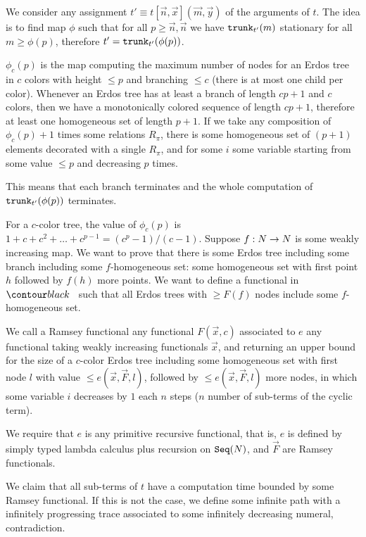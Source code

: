 We consider any assignment $t' \equiv t[\vec{n},\vec{x}](\vec{m},\vec{y})$ of the arguments of $t$.
The idea is to find map $\phi$ such that for all $p \ge \vec{n}, \vec{n}$ we have
${\tt trunk}_{t'}(m)$ stationary for all $m \ge \phi(p)$, therefore $t' = {\tt trunk}_{t'}(\phi(p))$.

$\phi_c(p)$ is the map computing the maximum number of nodes for an Erdos tree in $c$
colors with height $\le p$ and branching $\le c$ (there is at most one child per color).
Whenever an Erdos tree has at least a branch of length $cp+1$ and $c$ colors, 
then we have a monotonically colored sequence
of length $cp+1$, therefore at least one homogeneous set of length $p+1$. If we take any composition of 
$\phi_c(p)+1$ times some relations $R_\pi$, there is some homogeneous set of $(p+1)$ elements
decorated with a single $R_\pi$, and for some $i$ some variable starting from some value $\le p$ 
and decreasing $p$ times. 

This means that each branch terminates and the whole computation of ${\tt trunk}_{t'}(\phi(p))$ terminates.

For a $c$-color tree, the value of $\phi_c(p)$ is $1+c+c^2+\ldots+c^{p-1} = (c^{p}-1)/(c-1)$.
Suppose $f:{N} \rightarrow {N}$ is some weakly increasing map. We want to prove that
there is some Erdos tree including some branch including some $f$-homogeneous set: some
homogeneous set with first point $h$ followed by $f(h)$ more points. We
want to define a functional in $\systemT$ such that all Erdos trees with $\ge F(f)$ nodes
include some $f$-homogeneous set.

We call a Ramsey functional any functional $F(\vec{x},c)$ associated to $e$
any functional taking weakly increasing functionals $\vec{x}$,
and returning an upper bound for the size of a $c$-color Erdos tree including some homogeneous set
with first node $l$ with value $\le e(\vec{x},\vec{F},l)$, 
followed by $\le e(\vec{x},\vec{F},l)$ more nodes, in which some variable $i$ decreases by $1$
each $n$ steps ($n$ number of sub-terms of the cyclic term). 

We require that $e$ is any primitive recursive
functional, that is, $e$ is 
defined by simply typed lambda calculus plus recursion on ${\tt Seq}({N})$, and $\vec{F}$ are Ramsey functionals.

We claim that all sub-terms of $t$ have a computation time bounded by some Ramsey functional.
If this is not the case, we define some infinite path with a infinitely progressing trace
associated to some infinitely decreasing numeral, contradiction.

